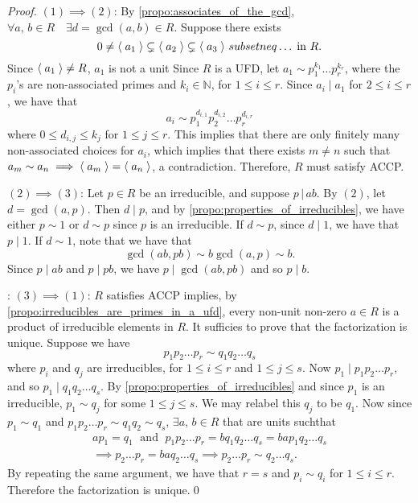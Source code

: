\begin{proof}
  $(1) \implies (2)$: By \cref{propo:associates_of_the_gcd}, $\forall a, \, b \in R \quad \exists d = \gcd(a, b) \in R$. Suppose there exists
  \begin{equation*}
    0 \neq \langle \; a_1 \; \rangle \subsetneq \langle \; a_2 \; \rangle \subsetneq \langle \; a_3 \; \rangle\ subsetneq \hdots \; \text{in } R.
  \end{equation*}
  Since $\langle \; a_1 \; \rangle \neq R$, $a_1$ is not a unit Since $R$ is a UFD, let $a_1 \sim p_1^{k_1} \hdots p_r^{k_r}$, where the $p_i$'s are non-associated primes and $k_i \in \mathbb{N}$, for $1 \leq i \leq r$. Since $a_i \mid a_1$ for $2 \leq i \leq r$, we have that
  \begin{equation*}
    a_i \sim p_1^{d_{i, 1}} p_2^{d_{i, 2}} \hdots p_r^{d_{i, r}}
  \end{equation*}
  where $0 \leq d_{i, j} \leq k_j$ for $1 \leq j \leq r$. This implies that there are only finitely many non-associated choices for $a_i$, which implies that there exists $m \neq n$ such that $a_m \sim a_n \implies \langle \; a_m \; \rangle = \langle \; a_n \; \rangle$, a contradiction. Therefore, $R$ must satisfy ACCP.

  \noindent $(2) \implies (3)$: Let $p \in R$ be an irreducible, and suppose $p \, | \, ab$. By $(2)$, let $d = \gcd(a, p)$. Then $d \mid p$, and by \cref{propo:properties_of_irreducibles}, we have either $p \sim 1$ or $d \sim p$ since $p$ is an irreducible. If $d \sim p$, since $d \mid 1$, we have that $p \mid 1$. If $d \sim 1$, note that we have that
  \begin{equation*}
    \gcd(ab, pb) \sim b \gcd(a, p) \sim b.
  \end{equation*}
  Since $p \mid ab$ and $p \mid pb$, we have $p \mid \gcd(ab, pb)$ and so $p \mid b$.

  \noindent: $(3) \implies (1)$: $R$ satisfies ACCP implies, by \cref{propo:irreducibles_are_primes_in_a_ufd}, every non-unit non-zero $a \in R$ is a product of irreducible elements in $R$. It sufficies to prove that the factorization is unique. Suppose we have
  \begin{equation*}
    p_1 p_2 \hdots p_r \sim q_1 q_2 \hdots q_s
  \end{equation*}
  where $p_i$ and $q_j$ are irreducibles, for $1 \leq i \leq r$ and $1 \leq j \leq s$. Now $p_1 \mid p_1 p_2 \hdots p_r$, and so $p_1 \mid q_1 q_2 \hdots q_s$. By \cref{propo:properties_of_irreducibles} and since $p_1$ is an irreducible, $p_1 \sim q_j$ for some $1 \leq j \leq s$. We may relabel this $q_j$ to be $q_1$. Now since $p_1 \sim q_1$ and $p_1 p_2 \hdots p_r \sim q_1 q_2 \sim q_s$, $\exists a, \, b \in R$ that are units suchthat
  \begin{gather*}
    ap_1 = q_1 \; \text{ and } \; p_1 p_2 \hdots p_r = b q_1 q_2 \hdots q_s = bap_1 q_2 \hdots q_s \\
    \implies p_2 \hdots p_r = ba q_2 \hdots q_s \implies p_2 \hdots p_r \sim q_2 \hdots q_s.
  \end{gather*}
  By repeating the same argument, we have that $r = s$ and $p_i \sim q_i$ for $1 \leq i \leq r$. Therefore the factorization is unique.\qed
\end{proof}

